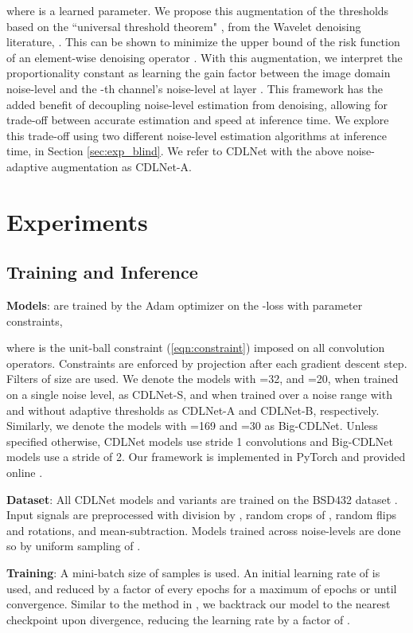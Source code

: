 \documentclass[conference]{IEEEtran}
\begin{document}
where  is a learned parameter. We propose this augmentation of the thresholds based on the ``universal threshold theorem" \cite{Mallat}, from the Wavelet denoising literature,
.
This can be shown to minimize the upper bound of the risk function of an element-wise denoising operator \cite{Mallat}.
With this augmentation, we interpret the proportionality constant  as learning the gain factor between the image domain noise-level  and the -th channel's noise-level at layer . This framework has the added benefit of decoupling noise-level estimation from denoising, allowing for trade-off between accurate estimation and speed at inference time. We explore this trade-off using two different noise-level estimation algorithms at inference time, in Section \ref{sec:exp_blind}. We refer to CDLNet with the above noise-adaptive augmentation as CDLNet-A. 

\section{Experiments} \label{sec:exp}
\subsection{Training and Inference}
\textbf{Models}: are trained by the Adam \cite{adam} optimizer on the -loss with parameter constraints,

where  is the unit-ball constraint (\ref{eqn:constraint}) imposed on all convolution operators. Constraints are enforced by projection after each gradient descent step. Filters of size  are used. We denote the models with =32, and =20, when trained on a single noise level, as CDLNet-S, and when trained over a noise range with and without adaptive thresholds as \mbox{CDLNet-A} and \mbox{CDLNet-B}, respectively. Similarly, we denote the models with =169 and =30 as Big-CDLNet. Unless specified otherwise, CDLNet models use stride 1 convolutions and Big-CDLNet models use a stride of 2. Our framework is implemented in PyTorch and provided online \cite{GithubLink}.

\textbf{Dataset}: All CDLNet models and variants are trained on the BSD432 dataset \cite{bsd}. Input signals are preprocessed with division by , random crops of , random flips and rotations, and mean-subtraction. Models trained across noise-levels are done so by uniform sampling of .

\textbf{Training}: A mini-batch size of  samples is used. An initial learning rate of  is used, and reduced by a factor of  every  epochs for a maximum of  epochs or until convergence. Similar to the method in \cite{Lecouat2020Games}, we backtrack our model to the nearest checkpoint upon divergence, reducing the learning rate by a factor of . 
\end{document}

